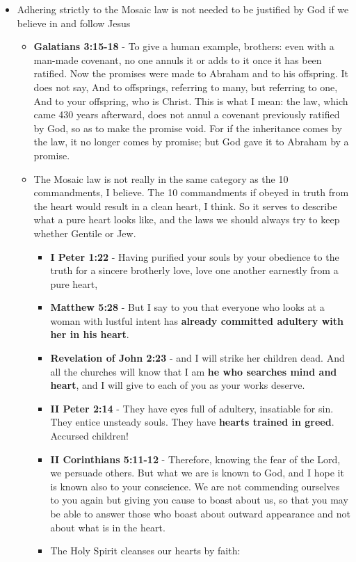 \documentclass[11pt]{article}
\begin{document}
\begin{itemize}
\begin{itemize}
\end{itemize}
\item Adhering strictly to the Mosaic law is not needed to be justified by God if we believe in and follow Jesus
\begin{itemize}
\item \textbf{Galatians 3:15-18} - To give a human example, brothers: even with a man-made covenant, no one annuls it or adds to it once it has been ratified. Now the promises were made to Abraham and to his offspring. It does not say, And to offsprings, referring to many, but referring to one, And to your offspring, who is Christ. This is what I mean: the law, which came 430 years afterward, does not annul a covenant previously ratified by God, so as to make the promise void. For if the inheritance comes by the law, it no longer comes by promise; but God gave it to Abraham by a promise.
\item The Mosaic law is not really in the same category as the 10 commandments, I believe. The 10 commandments if obeyed in truth from the heart would result in a clean heart, I think. So it serves to describe what a pure heart looks like, and the laws we should always try to keep whether Gentile or Jew.
\begin{itemize}
\item \textbf{I Peter 1:22} - Having purified your souls by your obedience to the truth for a sincere brotherly love, love one another earnestly from a pure heart,
\item \textbf{Matthew 5:28} - But I say to you that everyone who looks at a woman with lustful intent has \textbf{already committed adultery with her in his heart}.
\item \textbf{Revelation of John 2:23} - and I will strike her children dead. And all the churches will know that I am \textbf{he who searches mind and heart}, and I will give to each of you as your works deserve.
\item \textbf{II Peter 2:14} - They have eyes full of adultery, insatiable for sin. They entice unsteady souls. They have \textbf{hearts trained in greed}. Accursed children!
\item \textbf{II Corinthians 5:11-12} - Therefore, knowing the fear of the Lord, we persuade others. But what we are is known to God, and I hope it is known also to your conscience. We are not commending ourselves to you again but giving you cause to boast about us, so that you may be able to answer those who boast about outward appearance and not about what is in the heart.
\item The Holy Spirit cleanses our hearts by faith:

\end{itemize}
\end{itemize}
\end{itemize}
\end{document}
